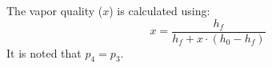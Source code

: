 The vapor quality (\(x\)) is calculated using:  
\[
x = \frac{h_f}{h_f + x \cdot \left(h_0 - h_f\right)}
\]  
It is noted that \(p_4 = p_3\).